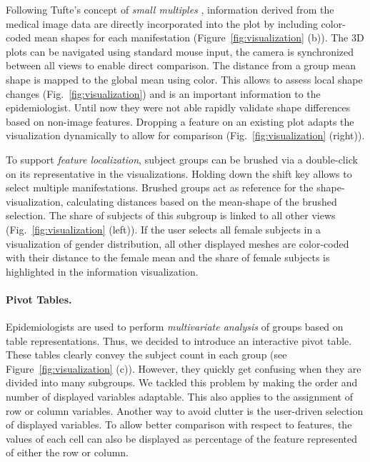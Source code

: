 \documentclass[journal]{style/vgtc} 			          %
\begin{document}
%
%
Following Tufte's concept of \emph{small multiples} \cite{Tufte1983}, information derived from the medical image data are directly incorporated into the plot by including color-coded mean shapes for each manifestation (Figure~\ref{fig:visualization} (b)).
%
The 3D plots can be navigated using standard mouse input, the camera is synchronized between all views to enable direct comparison.
%
The distance from a group mean shape is mapped to the global mean using color.
%
This allows to assess local shape changes (Fig.~\ref{fig:visualization}) and is an important information to the epidemiologist.
%
Until now they were not able rapidly validate shape differences based on non-image features.
%
Dropping a feature on an existing plot adapts the visualization dynamically to allow for comparison (Fig.~\ref{fig:visualization} (right)).

To support \emph{feature localization}, subject groups can be brushed via a double-click on its representative in the visualizations.
%
Holding down the shift key allows to select multiple manifestations.
%
Brushed groups act as reference for the shape-visualization, calculating distances based on the mean-shape of the brushed selection.
%
The share of subjects of this subgroup is linked to all other views (Fig.~\ref{fig:visualization} (left)).
%
If the user selects all female subjects in a visualization of gender distribution, all other displayed meshes are color-coded with their distance to the female mean and the share of female subjects is highlighted in the information visualization.
%

\paragraph{Pivot Tables.}
%
Epidemiologists are used to perform \emph{multivariate analysis} of groups based on table representations.
%
Thus, we decided to introduce an interactive pivot table.
%
These tables clearly convey the subject count in each group (see Figure~\ref{fig:visualization} (c)).
%
However, they quickly get confusing when they are divided into many subgroups.
%
We tackled this problem by making the order and number of displayed variables adaptable.
%
This also applies to the assignment of row or column variables.
%
Another way to avoid clutter is the user-driven selection of displayed variables.
%
To allow better comparison with respect to features, the values of each cell can also be displayed as percentage of the feature represented of either the row or column.
\end{document}

